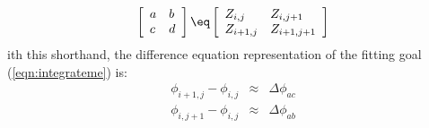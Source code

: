 \par
\begin{equation}
        \left[
                \begin{array}{ll}
                a & b \\
                c & d
                \end{array}
        \right]
        \eq
        \left[
                \begin{array}{ll}
                Z_{i,j}   & Z_{i,j+1} \\
                Z_{i+1,j} & Z_{i+1,j+1}
                \end{array}
        \right]
\end{equation}
ith this shorthand, the difference equation representation of the fitting goal (\ref{eqn:integrateme}) is: 
\begin{equation}
        \begin{array}{rcl}
                \phi_{i+1,j} -\phi_{i,j} &\approx& \Delta\phi_{ac} \\
                \phi_{i,j+1} -\phi_{i,j} &\approx& \Delta\phi_{ab}
        \end{array}
\label{eqn:diffgrad}
\end{equation}

